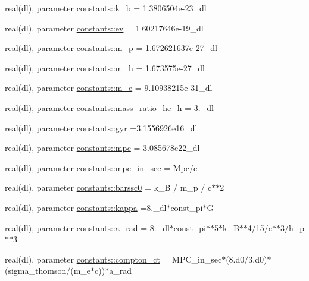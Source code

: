 \begin{DoxyCompactItemize}
real(dl), parameter \mbox{\hyperlink{namespaceconstants_a5beb5fedefa5380e9fb06e6bd8a16d43}{constants\+::k\+\_\+b}} = 1.\+3806504e-\/23\+\_\+dl
\item 
real(dl), parameter \mbox{\hyperlink{namespaceconstants_addbb41b1f5963fd51db70e3dced89700}{constants\+::ev}} = 1.\+60217646e-\/19\+\_\+dl
\item 
real(dl), parameter \mbox{\hyperlink{namespaceconstants_af32db00e3c1473bdccb379fea19b3921}{constants\+::m\+\_\+p}} = 1.\+672621637e-\/27\+\_\+dl
\item 
real(dl), parameter \mbox{\hyperlink{namespaceconstants_a0246217a8783fa2adbd3bba601bfb7fb}{constants\+::m\+\_\+h}} = 1.\+673575e-\/27\+\_\+dl
\item 
real(dl), parameter \mbox{\hyperlink{namespaceconstants_a9337199d9a72664967dbaf4132e99266}{constants\+::m\+\_\+e}} = 9.\+10938215e-\/31\+\_\+dl
\item 
real(dl), parameter \mbox{\hyperlink{namespaceconstants_af8b29ede25f97b7cd054d486d8bf649c}{constants\+::mass\+\_\+ratio\+\_\+he\+\_\+h}} = 3.\+\_\+dl
\item 
real(dl), parameter \mbox{\hyperlink{namespaceconstants_a6b6035602c42bfffde2ac46fd0c0ae0c}{constants\+::gyr}} =3.\+1556926e16\+\_\+dl
\item 
real(dl), parameter \mbox{\hyperlink{namespaceconstants_a8375c8f64af8b53668cecd9e5c58fea2}{constants\+::mpc}} = 3.\+085678e22\+\_\+dl
\item 
real(dl), parameter \mbox{\hyperlink{namespaceconstants_ab60f94607e30c3b961f91dce9248e2bd}{constants\+::mpc\+\_\+in\+\_\+sec}} = Mpc/c
\item 
real(dl), parameter \mbox{\hyperlink{namespaceconstants_a849ef8cb73f59304fa5e01297f4d040d}{constants\+::barssc0}} = k\+\_\+B / m\+\_\+p / c$\ast$$\ast$2
\item 
real(dl), parameter \mbox{\hyperlink{namespaceconstants_a1c51ffffcc61d146e0a27d8340cba5c3}{constants\+::kappa}} =8.\+\_\+dl$\ast$const\+\_\+pi$\ast$G
\item 
real(dl), parameter \mbox{\hyperlink{namespaceconstants_a8930b886e85c5c95942db45cb3485fbe}{constants\+::a\+\_\+rad}} = 8.\+\_\+dl$\ast$const\+\_\+pi$\ast$$\ast$5$\ast$k\+\_\+B$\ast$$\ast$4/15/c$\ast$$\ast$3/h\+\_\+p$\ast$$\ast$3
\item 
real(dl), parameter \mbox{\hyperlink{namespaceconstants_a3052f16975d19bbadee1a287f219830a}{constants\+::compton\+\_\+ct}} = M\+P\+C\+\_\+in\+\_\+sec$\ast$(8.d0/3.d0)$\ast$(sigma\+\_\+thomson/(m\+\_\+e$\ast$c))$\ast$a\+\_\+rad
\item 
$$
\end{DoxyCompactItemize}
